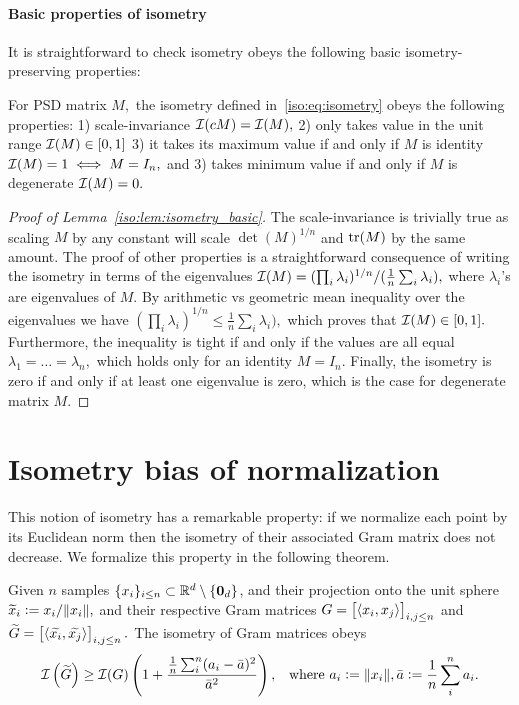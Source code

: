 \paragraph{Basic properties of isometry}
It is straightforward to check isometry obeys the following basic isometry-preserving properties: 
\begin{lemma}\label{iso:lem:isometry_basic}
For PSD matrix $M,$ the isometry defined in~\eqref{iso:eq:isometry} obeys the following properties: 1) scale-invariance $\mathcal{I}(c M) = \mathcal{I}(M),$ 2) only takes value in the unit range $\mathcal{I}(M)\in [0,1]$ 3) it takes its maximum value if and only if $M$ is identity $\mathcal{I}(M)=1\iff M=I_n,$ and 3) takes minimum value if and only if $M$ is degenerate $\mathcal{I}(M)=0. $
\end{lemma}
\begin{proof}[Proof of Lemma~\ref{iso:lem:isometry_basic}]
 The scale-invariance is trivially true as scaling $M$ by any constant will scale $\det(M)^{1/n}$ and $\mathrm{tr}(M)$ by the same amount. The proof of other properties is a straightforward consequence of writing the isometry in terms of the eigenvalues $\mathcal{I}(M) = (\prod_i \lambda_i)^{1/n}/(\frac1n\sum_i \lambda_i ), $ where $\lambda_i$'s are eigenvalues of $M.$ By arithmetic vs geometric mean inequality over the eigenvalues we have $(\prod_i \lambda_i)^{1/n}\le \frac1n\sum_i \lambda_i ),$ which proves that $\mathcal{I}(M)\in [0,1].$ Furthermore, the inequality is tight if and only if the values are all equal $\lambda_1 = \dots =\lambda_n,$ which holds only for an identity $M=I_n$. Finally, the isometry is zero if and only if at least one eigenvalue is zero, which is the case for degenerate matrix $M.$ 
\end{proof}


\section{Isometry bias of normalization}

This notion of isometry has a remarkable property: if we normalize each point by its Euclidean norm  then the isometry of their associated Gram matrix does not decrease. We formalize this property in the following theorem.


\begin{theorem}\label{iso:thm:isometry_normalization}
Given $n$ samples $\{x_i\}_{i\le n}\subset \mathbb{R}^d\setminus\{\bm{0}_d\}$, and their projection onto the unit sphere $\widetilde{x}_i:=x_i/\lVert x_i\rVert,$ and their respective Gram matrices $G = \left[\langle x_i,x_j\rangle\right]_{i,j\le n}$ and $\widetilde{G} = \left[\langle \widetilde{x_i},\widetilde{x_j}\rangle\right]_{i,j\le n}.$ The isometry of Gram matrices obeys
\begin{align}
 \mathcal{I}\left(\widetilde{G}\right) \ge \mathcal{I}(G)\left(1+\frac{\frac1n \sum_i^n(a_i-\bar{a})^2}{\bar{a}^2}\right), && \text{where } a_i:=\lVert x_i\rVert, \bar{a}:=\frac1n\sum_i^n a_i. 
\end{align}
\end{theorem}

